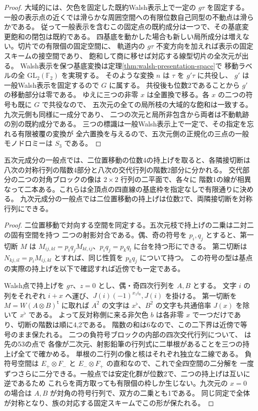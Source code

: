 \begin{proof}
大域的には、欠色を固定した既約Walsh表示上で一定の $g\tau$ を固定する。
一般の表示点の近くでは滑らかな周囲空間への有限位数自己同型の不動点は滑らかである。
従って一般表示を含むこの固定点の既約成分は一つで、その基底変更飽和の閉包は既約である。
四基底を動かした場合も新しい局所成分は増えない。切片での有限個の固定空間に、
軌道内の $g\tau$ 不変方向を加えれば表示の固定スキームの接空間であり、
飽和して商に移せば対応する線型切片の全次元が出る。
Walsh表示を保つ基底変換は定理\ref{thm:walsh-presentation-space}で
移動ラベルの全 $\mathrm{GL}_2(\mathbb F_2)$ を実現する。
そのような変換 $n$ は $\tau$ を $g'\tau$ に共役し、
$g'$ は一般Walsh表示を固定するので $G$ に属する。
共役後も位数2であることから $g'$ の移動部分は零である。
ゆえに三つの非零 $x$ は全置換で移る。各 $x$ の二つの符号も既に $G$ で共役なので、
五次元の全ての局所枝の大域的な飽和は一致する。九次元側も同様に一成分であり、
二つの次元と局所非包含から両者は不動軌跡の別の既約成分である。
三つの標識は一般Walsh表示上で一定で、その指定を忘れる有限被覆の変換が
全六置換を与えるので、五次元側の正規化の三点の一般モノドロミーは $S_3$ である。
\end{proof}

\begin{proposition}\label{prop:half-period-pencils}
五次元成分の一般点では、二位置移動の位数4の持上げを取ると、各隣接切断は
八次の対称行列の階数4部分と八次の交代行列の階数2部分に分かれる。
交代部分の二つの対角ブロックの像は $2\times2$ 行列の二平面で、各々に
階数1の線が相異なって二本ある。これらは全頂点の四直線の基底枠を指定なしで有限通りに決める。
九次元成分の一般点では二位置移動の持上げは位数2で、両隣接切断を対称行列にできる。
\end{proposition}
\begin{proof}
二位置移動で対向する空間を同定する。五次元枝で持上げの二乗は二対二の固有空間を持つ
二つの射影対合である。偶、奇の符号を $p_i,q_j$ とすると、第一切断 $M$ は
$M_{ij,kl}=p_i q_j M_{kl,ij}$、$p_i q_j=p_k q_l$ に台を持つ形にできる。
第二切断は $N_{kj,il}=p_i M_{ij,kl}$ とすれば、同じ性質を $p_k q_j$ について持つ。
この符号の型は基点の実際の持上げを以下で確認すれば近傍でも一定である。

Walsh点で持上げを $g\tau$、$z=0$ とし、偶・奇四次行列を $A,B$ とする。
文字 $i$ の列をそれぞれ $i+x$ へ運び、$J(i)(-1)^{x_1 i_0},J(i)$ を掛ける。
第一切断を $M=W(A\otimes B)^{\mathsf t}$ に取れば
$A^2$ の文字は $x^\flat$、$B^2$ の文字も共通倍率 $J(x)$ を除いて $x^\flat$ である。
よって反対称側に来る非欠色 $b$ は各非零 $x$ で一つだけであり、切断の階数は順に4,2である。
階数の和は6なので、この二下界は近傍で等号のまま保たれる。
二つの負符号ブロックの内部の四次交代行列について、
 は先の53の点で
各像が二次元、射影鉛筆の行列式に二単根があることを三つの持上げ全てで確かめる。
単根の二行列の像と核はそれぞれ独立な二線である。
負符号空間は $E_+\otimes F_-$ と $E_-\otimes F_+$ の直和なので、これで全四空間の二分解を
一度ずつさらに二分できる。一般点では安定化群が位数2で、二つの持上げは互いに逆であるため
これらを両方取っても有限個の枠しか生じない。九次元の $x=0$ の場合は
$A,B$ が対角の符号行列で、双方の二乗とも1である。
同じ同定で全体が対称となり、族の対応する固定スキームでこの形が保たれる。
\end{proof}

